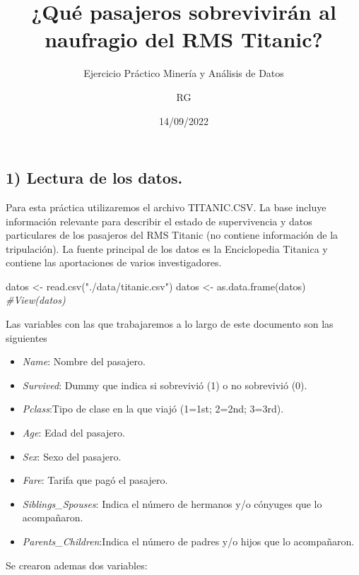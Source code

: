 \documentclass[
]{article}
\title{¿Qué pasajeros sobrevivirán al naufragio del RMS Titanic?}
\subtitle{Ejercicio Práctico Minería y Análisis de Datos}
\author{RG}
\date{14/09/2022}
\newenvironment{Shaded}{\begin{snugshade}}{\end{snugshade}}
\newcommand{\CommentTok}[1]{\textcolor[rgb]{0.56,0.35,0.01}{\textit{#1}}}
\newcommand{\FunctionTok}[1]{\textcolor[rgb]{0.00,0.00,0.00}{#1}}
\newcommand{\NormalTok}[1]{#1}
\newcommand{\OtherTok}[1]{\textcolor[rgb]{0.56,0.35,0.01}{#1}}
\newcommand{\StringTok}[1]{\textcolor[rgb]{0.31,0.60,0.02}{#1}}
\begin{document}
\maketitle

\hypertarget{lectura-de-los-datos.}{%
\subsection{1) Lectura de los datos.}\label{lectura-de-los-datos.}}

Para esta práctica utilizaremos el archivo TITANIC.CSV. La base incluye
información relevante para describir el estado de supervivencia y datos
particulares de los pasajeros del RMS Titanic (no contiene información
de la tripulación). La fuente principal de los datos es la Enciclopedia
Titanica y contiene las aportaciones de varios investigadores.

\begin{Shaded}
\begin{Highlighting}[]
\NormalTok{datos }\OtherTok{\textless{}{-}} \FunctionTok{read.csv}\NormalTok{(}\StringTok{"./data/titanic.csv"}\NormalTok{)}
\NormalTok{datos }\OtherTok{\textless{}{-}} \FunctionTok{as.data.frame}\NormalTok{(datos)}
\CommentTok{\#View(datos)}
\end{Highlighting}
\end{Shaded}

Las variables con las que trabajaremos a lo largo de este documento son
las siguientes

\begin{itemize}
\item
  \emph{Name}: Nombre del pasajero.
\item
  \emph{Survived}: Dummy que indica si sobrevivió (1) o no sobrevivió
  (0).
\item
  \emph{Pclass}:Tipo de clase en la que viajó (1=1st; 2=2nd; 3=3rd).
\item
  \emph{Age}: Edad del pasajero.
\item
  \emph{Sex}: Sexo del pasajero.
\item
  \emph{Fare}: Tarifa que pagó el pasajero.
\item
  \emph{Siblings\_Spouses}: Indica el número de hermanos y/o cónyuges
  que lo acompañaron.
\item
  \emph{Parents\_Children}:Indica el número de padres y/o hijos que lo
  acompañaron.
\end{itemize}

Se crearon ademas dos variables:
\end{document}

